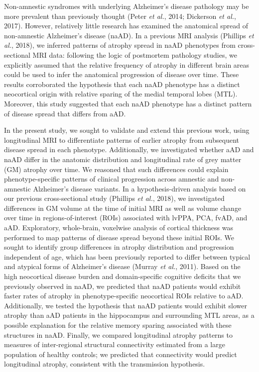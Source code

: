 \documentclass[]{article}
\begin{document}
Non-amnestic syndromes with underlying Alzheimer's disease pathology may
be more prevalent than previously thought (Peter \emph{et al.}, 2014;
Dickerson \emph{et al.}, 2017). However, relatively little research has
examined the anatomical spread of non-amnestic Alzheimer's disease
(naAD). In a previous MRI analysis (Phillips \emph{et al.}, 2018), we
inferred patterns of atrophy spread in naAD phenotypes from
cross-sectional MRI data: following the logic of postmortem pathology
studies, we explicitly assumed that the relative frequency of atrophy in
different brain areas could be used to infer the anatomical progression
of disease over time. These results corroborated the hypothesis that
each naAD phenotype has a distinct neocortical origin with relative
sparing of the medial temporal lobes (MTL). Moreover, this study
suggested that each naAD phenotype has a distinct pattern of disease
spread that differs from aAD.

In the present study, we sought to validate and extend this previous
work, using longitudinal MRI to differentiate patterns of earlier
atrophy from subsequent disease spread in each phenotype. Additionally,
we investigated whether aAD and naAD differ in the anatomic distribution
and longitudinal rate of grey matter (GM) atrophy over time. We reasoned
that such differences could explain phenotype-specific patterns of
clinical progression across amnestic and non-amnestic Alzheimer's
disease variants. In a hypothesis-driven analysis based on our previous
cross-sectional study (Phillips \emph{et al.}, 2018), we investigated
differences in GM volume at the time of initial MRI as well as volume
change over time in regions-of-interest (ROIs) associated with lvPPA,
PCA, fvAD, and aAD. Exploratory, whole-brain, voxelwise analysis of
cortical thickness was performed to map patterns of disease spread
beyond these initial ROIs. We sought to identify group differences in
atrophy distribution and progression independent of age, which has been
previously reported to differ between typical and atypical forms of
Alzheimer's disease (Murray \emph{et al.}, 2011). Based on the high
neocortical disease burden and domain-specific cognitive deficits that
we previously observed in naAD, we predicted that naAD patients would
exhibit faster rates of atrophy in phenotype-specific neocortical ROIs
relative to aAD. Additionally, we tested the hypothesis that naAD
patients would exhibit slower atrophy than aAD patients in the
hippocampus and surrounding MTL areas, as a possible explanation for the
relative memory sparing associated with these structures in naAD.
Finally, we compared longitudinal atrophy patterns to measures of
inter-regional structural connectivity estimated from a large population
of healthy controls; we predicted that connectivity would predict
longitudinal atrophy, consistent with the transmission hypothesis.
\end{document}
